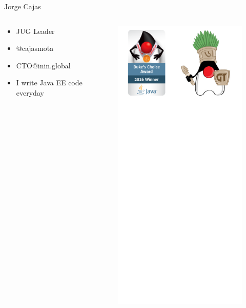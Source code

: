 \documentclass{beamer}
\begin{document}
\begin{frame}{Jorge Cajas}
\begin{columns}[T] %
	\begin{column}[T]{5cm} %
		\begin{itemize}
			\item JUG Leader
			\item @cajasmota
			\item CTO@inin.global
			\item I write Java EE code everyday	
	\end{itemize}
	\end{column}
	\begin{column}[T]{5cm} %
		\begin{figure}
			\centering
			\includegraphics[width=0.6\linewidth]{Images/logoscajas}
		\end{figure}
		
	\end{column}
\end{columns}
\end{frame}
\end{document}
